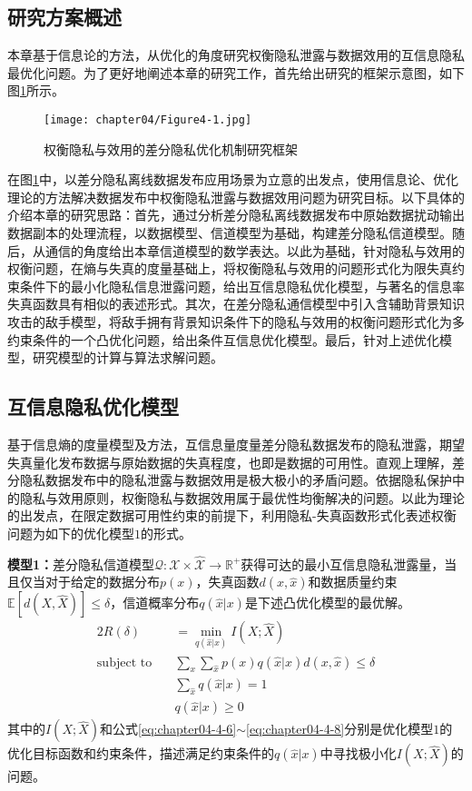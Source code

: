 \subsection{研究方案概述}\label{subsec:chapter05-yjsl}
本章基于信息论的方法，从优化的角度研究权衡隐私泄露与数据效用的互信息隐私最优化问题。为了更好地阐述本章的研究工作，首先给出研究的框架示意图，如下图\ref{Fig:chapter05-1}所示。
\begin{figure}[htbp]
	\centering
	\texttt{[image: chapter04/Figure4-1.jpg]}
	\caption{权衡隐私与效用的差分隐私优化机制研究框架}
	\label{Fig:chapter05-1}
\end{figure}

在图\ref{Fig:chapter05-1}中，以差分隐私离线数据发布应用场景为立意的出发点，使用信息论、优化理论的方法解决数据发布中权衡隐私泄露与数据效用问题为研究目标。以下具体的介绍本章的研究思路：首先，通过分析差分隐私离线数据发布中原始数据扰动输出数据副本的处理流程，以数据模型、信道模型为基础，构建差分隐私信道模型。随后，从通信的角度给出本章信道模型的数学表达。以此为基础，针对隐私与效用的权衡问题，在熵与失真的度量基础上，将权衡隐私与效用的问题形式化为限失真约束条件下的最小化隐私信息泄露问题，给出互信息隐私优化模型，与著名的信息率失真函数具有相似的表述形式。其次，在差分隐私通信模型中引入含辅助背景知识攻击的敌手模型，将敌手拥有背景知识条件下的隐私与效用的权衡问题形式化为多约束条件的一个凸优化问题，给出条件互信息优化模型。最后，针对上述优化模型，研究模型的计算与算法求解问题。

\subsection{互信息隐私优化模型}\label{subsec:chapter05-mi-optimazation}
基于信息熵的度量模型及方法，互信息量度量差分隐私数据发布的隐私泄露，期望失真量化发布数据与原始数据的失真程度，也即是数据的可用性。直观上理解，差分隐私数据发布中的隐私泄露与数据效用是极大极小的矛盾问题。依据隐私保护中的隐私与效用原则\cite{sankar2013utility}，权衡隐私与数据效用属于最优性均衡解决的问题。以此为理论的出发点，在限定数据可用性约束的前提下，利用隐私-失真函数形式化表述权衡问题为如下的优化模型$1$的形式。

\textbf{模型1：}差分隐私信道模型$\mathcal{Q}:\mathcal{X}\times \mathcal{\hat{X}}\rightarrow \mathbb{R}^{+}$获得可达的最小互信息隐私泄露量，当且仅当对于给定的数据分布$p(x)$，失真函数$d(x,\hat{x})$和数据质量约束$\mathbb{E}[d(X,\hat{X})]\leq \delta$，信道概率分布$q(\hat{x}|x)$是下述凸优化模型的最优解。
\begin{alignat}{2}
	R(\delta) & =\min_{q(\hat{x}|x)}I(X;\hat{X}) \nonumber \\
	\mbox{subject to} \quad
	& \sum_{x}\sum_{\hat{x}}p(x)q(\hat{x}|x)d(x,\hat{x})\leq  \delta \label{eq:chapter04-4-6}\\
	& \sum_{\hat{x}}q(\hat{x}|x)=1 \\
	& q(\hat{x}|x) \geq 0\label{eq:chapter04-4-8}
\end{alignat}
其中的$I(X;\hat{X})$和公式\ref{eq:chapter04-4-6}$\sim$\ref{eq:chapter04-4-8}分别是优化模型$1$的优化目标函数和约束条件，描述满足约束条件的$q(\hat{x}|x)$中寻找极小化$I(X;\hat{X})$的问题。

